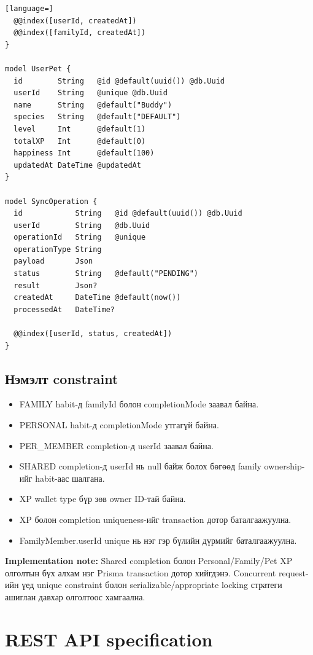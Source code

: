 \documentclass[12pt,a4paper,oneside]{report}
\begin{document}
\begin{lstlisting}[language=]
  @@index([userId, createdAt])
  @@index([familyId, createdAt])
}

model UserPet {
  id        String   @id @default(uuid()) @db.Uuid
  userId    String   @unique @db.Uuid
  name      String   @default("Buddy")
  species   String   @default("DEFAULT")
  level     Int      @default(1)
  totalXP   Int      @default(0)
  happiness Int      @default(100)
  updatedAt DateTime @updatedAt
}

model SyncOperation {
  id            String   @id @default(uuid()) @db.Uuid
  userId        String   @db.Uuid
  operationId   String   @unique
  operationType String
  payload       Json
  status        String   @default("PENDING")
  result        Json?
  createdAt     DateTime @default(now())
  processedAt   DateTime?

  @@index([userId, status, createdAt])
}
\end{lstlisting}

\section{Нэмэлт constraint}
\begin{itemize}
  \item FAMILY habit-д familyId болон completionMode заавал байна.
  \item PERSONAL habit-д completionMode утгагүй байна.
  \item PER\_MEMBER completion-д userId заавал байна.
  \item SHARED completion-д userId нь null байж болох бөгөөд family ownership-ийг habit-аас шалгана.
  \item XP wallet type бүр зөв owner ID-тай байна.
  \item XP болон completion uniqueness-ийг transaction дотор баталгаажуулна.
  \item FamilyMember.userId unique нь нэг гэр бүлийн дүрмийг баталгаажуулна.
\end{itemize}

\textbf{Implementation note:} Shared completion болон Personal/Family/Pet XP олголтын бүх алхам нэг Prisma transaction дотор хийгдэнэ. Concurrent request-ийн үед unique constraint болон serializable/appropriate locking стратеги ашиглан давхар олголтоос хамгаална.

\chapter{REST API specification}
\end{document}
